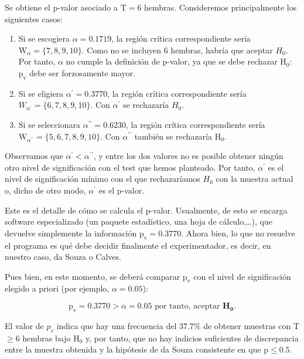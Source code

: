 \documentclass[
]{article}
\providecommand{\tightlist}{%
  \setlength{\itemsep}{0pt}\setlength{\parskip}{0pt}}
\begin{document}
Se obtiene el p-valor asociado a \(\mathrm{T}=6\) hembras. Consideremos principalmente los siguientes casos:

\begin{enumerate}
\def\labelenumi{\arabic{enumi}.}
\tightlist
\item
  Si se escogiera \(\alpha=0.1719\), la región crítica correspondiente sería \(\mathrm{W}_{\alpha}=\{7,8,9,10\}\). Como no se incluyen 6 hembras, habría que aceptar \(H_{0}\). Por tanto, \(\alpha\) no cumple la definición de p-valor, ya que se debe rechazar \(\mathrm{H}_{0}\): \(\mathrm{p}_{\mathrm{v}}\) debe ser forzosamente mayor.
\item
  Si se eligiera \(\alpha^{\prime}=0.3770\), la región crítica correspondiente sería \(W_{\alpha^{\prime}}=\{6,7,8,9,10\}\). Con \(\alpha^{\prime}\) se rechazaría \(H_{0}\).
\item
  Si se seleccionara \(\alpha^{\prime\prime}=0.6230\), la región crítica correspondiente sería \(\mathrm{W}_{\alpha^{\prime\prime}}=\{5,6,7,8,9,10\}\). Con \(\alpha^{\prime\prime}\) también se rechazaría \(\mathrm{H}_{0}\).
\end{enumerate}

Observamos que \(\alpha^{\prime}<\alpha^{\prime\prime}\), y entre los dos valores no es posible obtener ningún otro nivel de significación con el test que hemos planteado. Por tanto, \(\alpha^{\prime}\) es el nivel de significación mínimo con el que rechazaríamos \(H_{0}\) con la muestra actual o, dicho de otro modo, \(\alpha^{\prime}\) es el p-valor.

Este es el detalle de cómo se calcula el p-valor. Usualmente, de esto se encarga software especializado (un paquete estadístico, una hoja de cálculo,\ldots), que devuelve simplemente la información \(\mathrm{p}_{\mathrm{v}}=0.3770\). Ahora bien, lo que no resuelve el programa es qué debe decidir finalmente el experimentador, es decir, en nuestro caso, da Souza o Calves.

Pues bien, en este momento, se deberá comparar \(\mathrm{p}_{\mathrm{v}}\) con el nivel de significación elegido a priori (por ejemplo, \(\alpha=0.05\)):

\[
\mathrm{p}_{\mathrm{v}}=0.3770>\alpha=0.05 \text { por tanto, aceptar } \mathbf{H}_{\mathbf{0}}.
\]

El valor de \(p_{v}\) indica que hay una frecuencia del 37.7\% de obtener muestras con T \(\geq 6\) hembras bajo \(\mathrm{H}_{0}\) y, por tanto, que no hay indicios suficientes de discrepancia entre la muestra obtenida y la hipótesis de da Souza consistente en que \(\mathrm{p} \leq 0.5\).
\end{document}
